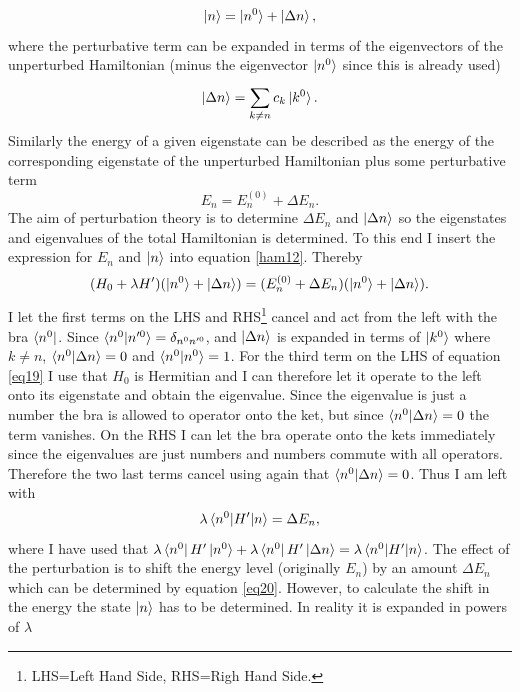 \begin{equation}
	\ket{n}=\ket{n^0}+\ket{\Delta n},
\end{equation} 
where the perturbative term can be expanded in terms of the eigenvectors of the unperturbed Hamiltonian (minus the eigenvector $\ket{n^0}$ since this is already used)
\begin{equation}
	\ket{\Delta n}=\sum_{k\neq n}^{}c_k\ket{k^0}.
\end{equation} 
Similarly the energy of a given eigenstate can be described as the energy of the corresponding eigenstate of the unperturbed Hamiltonian plus some perturbative term
\begin{equation}
	E_n=E_n^{(0)}+\Delta E_n.
\end{equation} 
The aim of perturbation theory is to determine $\Delta E_n$ and $\ket{\Delta n}$ so the eigenstates and eigenvalues of the total Hamiltonian is determined. To this end I insert the expression for $E_n$ and $\ket{n}$ into equation \eqref{ham12}. Thereby
\begin{equation}
	(H_0+\lambda H')(\ket{n^0}+\ket{\Delta n})=(E_n^{(0)}+\Delta E_n)(\ket{n^0}+\ket{\Delta n}).
	\label{eq19}
\end{equation} 
I let the first terms on the LHS and RHS\footnote{LHS=Left Hand Side, RHS=Righ Hand Side.} cancel and act from the left with the bra $\bra{n^0}$. Since $\braket{n^0|n'^0}=\delta_{n^0 n'^0}$, and $\ket{\Delta n}$ is expanded in terms of $\ket{k^0}$ where $k\neq n$, $\braket{n^0|\Delta n}=0$ and $\braket{n^0|n^0}=1$. For the third term on the LHS of equation \eqref{eq19} I use that $H_0$ is Hermitian and I can therefore let it operate to the left onto its eigenstate and obtain the eigenvalue. Since the eigenvalue is just a number the bra is allowed to operator onto the ket, but since $\braket{n^0|\Delta n}=0$ the term vanishes. On the RHS I can let the bra operate onto the kets immediately since the eigenvalues are just numbers and numbers commute with all operators. Therefore the two last terms cancel using again that $\braket{n^0|\Delta n}=0$. Thus I am left with
\begin{equation}
	\lambda\braket{n^0|H'|n}=\Delta E_n,
	\label{eq20}
\end{equation} 
where I have used that $\lambda\bra{n^0}H'\ket{n^0}+\lambda\bra{n^0}H'\ket{\Delta n}=\lambda\braket{n^0|H'|n}$. The effect of the perturbation is to shift the energy level (originally $E_n$) by an amount $\Delta E_n$ which can be determined by equation \eqref{eq20}. However, to calculate the shift in the energy the state $\ket{n}$ has to be determined. In reality it is expanded in powers of $\lambda$
